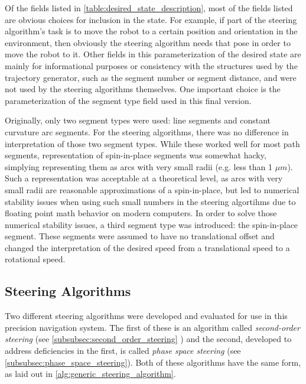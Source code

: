 Of the fields listed in \autoref{table:desired_state_description}, most of the fields listed are obvious choices for inclusion in the state. For example, if part of the steering algorithm's task is to move the robot to a certain position and orientation in the environment, then obviously the steering algorithm needs that pose in order to move the robot to it. Other fields in this parameterization of the desired state are mainly for informational purposes or consistency with the structures used by the trajectory generator, such as the segment number or segment distance, and were not used by the steering algorithms themselves. One important choice is the parameterization of the segment type field used in this final version.

Originally, only two segment types were used: line segments and constant curvature arc segments. For the steering algorithms, there was no difference in interpretation of those two segment types. While these worked well for most path segments, representation of spin-in-place segments was somewhat hacky, simplying representing them as arcs with very small radii (e.g. less than 1 $\mu m$). Such a representation was acceptable at a theoretical level, as arcs with very small radii are reasonable approximations of a spin-in-place, but led to numerical stability issues when using such small numbers in the steering algortihms due to floating point math behavior on modern computers. In order to solve those numerical stability issues, a third segment type was introduced: the spin-in-place segment. These segments were assumed to have no translational offset and changed the interpretation of the desired speed from a translational speed to a rotational speed.

\subsection{Steering Algorithms}\label{subsec:steering_algorithms}

Two different steering algorithms were developed and evaluated for use in this precision navigation system. The first of these is an algorithm called \emph{second-order steering} (see \autoref{subsubsec:second_order_steering} ) and the second, developed to address deficiencies in the first, is called \emph{phase space steering} (see \autoref{subsubsec:phase_space_steering}). Both of these algorithms have the same form, as laid out in \autoref{alg:generic_steering_algorithm}.

